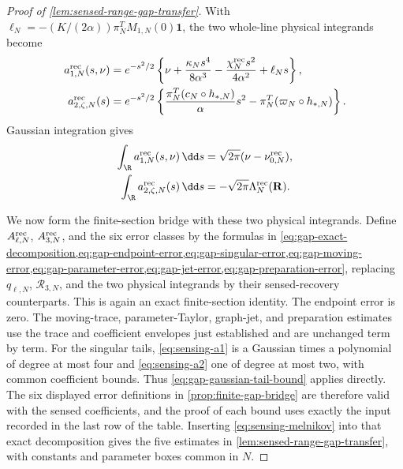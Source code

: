\begin{proof}[Proof of \cref{lem:sensed-range-gap-transfer}]
With \(\ell_N=-(K/(2\alpha))\pi_N^TM_{1,N}(0)\mathbf1\), the two
whole-line physical integrands become
\begin{align}
 a^{\rm rec}_{1,N}(s,\nu)
 &=e^{-s^2/2}\left\{\nu+
    \frac{\kappa_Ns^4}{8\alpha^3}
    -\frac{\chi_N^{\rm rec}s^2}{4\alpha^2}+\ell_Ns\right\},
                                                               \label{eq:sensing-a1}\\
 a^{\rm rec}_{2,\zeta,N}(s)
 &=e^{-s^2/2}\left\{
   \frac{\pi_N^T(c_N\circ h_{*,N})}{\alpha}s^2
       -\pi_N^T(\varpi_N\circ h_{*,N})\right\}.     \label{eq:sensing-a2}
\end{align}
Gaussian integration gives
\begin{align}
 \int_\R a^{\rm rec}_{1,N}(s,\nu)\,\dd s
 &=\sqrt{2\pi}(\nu-\nu_{0,N}^{\rm rec}),\notag\\
 \int_\R a^{\rm rec}_{2,\zeta,N}(s)\,\dd s
 &=-\sqrt{2\pi}\Lambda_N^{\rm rec}(\mathbf R).     \label{eq:sensing-melnikov}
\end{align}

We now form the finite-section bridge with these two physical integrands.
Define \(A^{\rm rec}_{\ell,N}\), \(A^{\rm rec}_{3,N}\), and the six error
classes by the formulas in
\cref{eq:gap-exact-decomposition,eq:gap-endpoint-error,eq:gap-singular-error,eq:gap-moving-error,eq:gap-parameter-error,eq:gap-jet-error,eq:gap-preparation-error},
replacing \(q_{\ell,N}\), \(\mathcal R_{3,N}\), and the two physical
integrands by their sensed-recovery counterparts.  This is again an exact
finite-section identity.  The endpoint error is zero.  The moving-trace,
parameter-Taylor, graph-jet, and preparation estimates use the trace and
coefficient envelopes just established and are unchanged term by term.
For the singular tails, \cref{eq:sensing-a1} is a Gaussian times a
polynomial of degree at most four and \cref{eq:sensing-a2} one of degree at
most two, with common coefficient bounds.  Thus
\cref{eq:gap-gaussian-tail-bound} applies directly.  The six displayed
error definitions in \cref{prop:finite-gap-bridge} are therefore valid with
the sensed coefficients, and the proof of each bound uses exactly the input
recorded in the last row of the table.  Inserting
\cref{eq:sensing-melnikov} into that exact decomposition gives the five
estimates in \cref{lem:sensed-range-gap-transfer}, with constants and
parameter boxes common in \(N\).
\end{proof}

